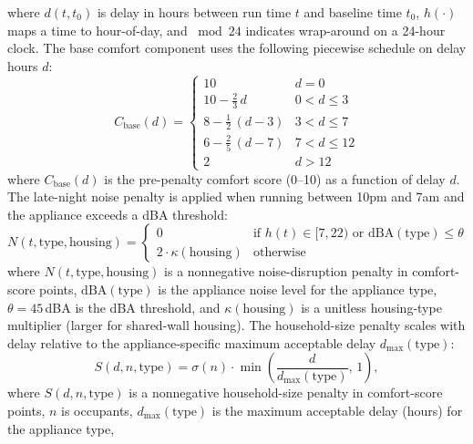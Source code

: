 \documentclass[final,3p,times]{elsarticle}
\begin{document}
\noindent where $d(t,t_0)$ is delay in hours between run time $t$ and baseline time $t_0$,
$h(\cdot)$ maps a time to hour-of-day, and $\bmod 24$ indicates wrap-around on a 24-hour clock.
The base comfort component uses the following piecewise schedule on delay hours $d$:
\begin{equation}
  C_{\mathrm{base}}(d)=
  \begin{cases}
    10                                  & d=0 \\[3pt]
    10-\frac{2}{3}\,d                   & 0<d\le 3 \\[3pt]
    8-\frac{1}{2}\,(d-3)                & 3<d\le 7 \\[3pt]
    6-\frac{2}{5}\,(d-7)                & 7<d\le 12 \\[3pt]
    2                                   & d>12
  \end{cases}
  \label{eq:appliance_base_comfort}
\end{equation}
\noindent where $C_{\mathrm{base}}(d)$ is the pre-penalty comfort score (0--10) as a function of delay $d$.
The late-night noise penalty is applied when running between 10pm and 7am and the appliance
exceeds a dBA threshold:
\begin{equation}
  N(t,\mathrm{type},\mathrm{housing})=
  \begin{cases}
    0 & \text{if } h(t)\in[7,22) \text{ or } \mathrm{dBA}(\mathrm{type})\le \theta \\[3pt]
    2\cdot \kappa(\mathrm{housing}) & \text{otherwise}
  \end{cases}
  \label{eq:appliance_noise_penalty}
\end{equation}
\noindent where $N(t,\mathrm{type},\mathrm{housing})$ is a nonnegative noise-disruption penalty in comfort-score points,
$\mathrm{dBA}(\mathrm{type})$ is the appliance noise level for the appliance type, $\theta=45$\,dBA is the dBA threshold,
and $\kappa(\mathrm{housing})$ is a unitless housing-type multiplier (larger for shared-wall housing).
The household-size penalty scales with delay relative to the appliance-specific maximum
acceptable delay $d_{\max}(\mathrm{type})$:
\begin{equation}
  S(d,n,\mathrm{type})=\sigma(n)\cdot \min\!\left(\frac{d}{d_{\max}(\mathrm{type})},\,1\right),
  \label{eq:appliance_size_penalty}
\end{equation}
\noindent where $S(d,n,\mathrm{type})$ is a nonnegative household-size penalty in comfort-score points,
$n$ is occupants, $d_{\max}(\mathrm{type})$ is the maximum acceptable delay (hours) for the appliance type,
\end{document}
